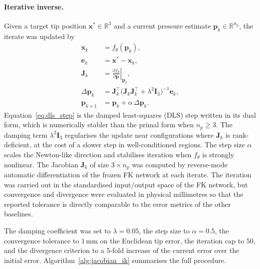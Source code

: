 \paragraph{Iterative inverse.}
Given a target tip position $\mathbf{x}^{*} \in \mathbb{R}^{3}$ and a current pressure estimate $\mathbf{p}_k \in \mathbb{R}^{n_p}$, the iterate was updated by
\begin{align}
  \mathbf{x}_k            &= f_{\theta}(\mathbf{p}_k), \label{eq:jac_forward} \\
  \mathbf{e}_k            &= \mathbf{x}^{*} - \mathbf{x}_k, \label{eq:jac_err} \\
  \mathbf{J}_k            &= \left.\frac{\partial f_{\theta}}{\partial \mathbf{p}}\right|_{\mathbf{p}_k}, \label{eq:jac_def} \\
  \Delta \mathbf{p}_k     &= \mathbf{J}_k^{\top} \bigl( \mathbf{J}_k \mathbf{J}_k^{\top} + \lambda^{2} \mathbf{I}_{3} \bigr)^{-1} \mathbf{e}_k, \label{eq:dls_step} \\
  \mathbf{p}_{k+1}        &= \mathbf{p}_k + \alpha \, \Delta \mathbf{p}_k. \label{eq:dls_update}
\end{align}
Equation~\eqref{eq:dls_step} is the damped least-squares (DLS) step written in its dual form, which is numerically stabler than the primal form when $n_p \ge 3$. The damping term $\lambda^{2} \mathbf{I}_{3}$ regularises the update near configurations where $\mathbf{J}_k$ is rank-deficient, at the cost of a slower step in well-conditioned regions. The step size $\alpha$ scales the Newton-like direction and stabilises iteration when $f_{\theta}$ is strongly nonlinear. The Jacobian $\mathbf{J}_k$ of size $3 \times n_p$ was computed by reverse-mode automatic differentiation of the frozen FK network at each iterate. The iteration was carried out in the standardised input/output space of the FK network, but convergence and divergence were evaluated in physical millimetres so that the reported tolerance is directly comparable to the error metrics of the other baselines.

The damping coefficient was set to $\lambda = 0.05$, the step size to $\alpha = 0.5$, the convergence tolerance to $1$\,mm on the Euclidean tip error, the iteration cap to $50$, and the divergence criterion to a $5$-fold increase of the current error over the initial error. Algorithm~\ref{alg:jacobian_ik} summarises the full procedure.


